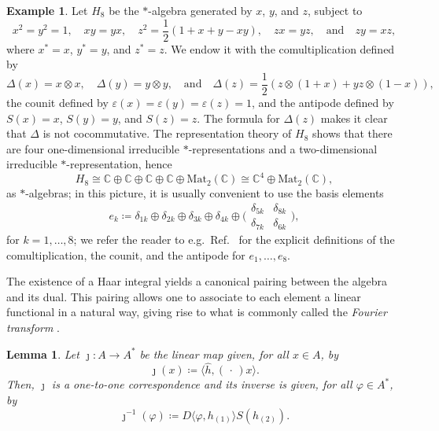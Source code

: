 \documentclass[a4paper,10pt]{amsart}
\newcommand{\eval}[2]{\langle #1 , #2\rangle}
\newcommand{\placeholder}{\,\cdot\,}
\newcommand{\newterm}[1]{\emph{#1}}
\newtheorem{lemma}[theorem]{Lemma}
\theoremstyle{definition}
\newtheorem{example}[theorem]{Example}
\begin{document}
\begin{example}\label{example:H8}
Let $H_8$ be the $*$-algebra generated by $x$, $y$, and $z$, subject to
\begin{equation}
    x^2 = y^2 = 1,
    \quad
    xy = yx,
    \quad
    z^2 = \frac{1}{2}(1 + x + y - xy),
    \quad
    zx = yz,
    \quad\text{and}\quad
    zy = xz,
\end{equation}
where $x^* = x$, $y^* = y$, and $z^*=z$.
We endow it with the comultiplication defined by
\begin{equation}
    \Delta(x) = x \otimes x,
    \quad 
    \Delta(y) = y \otimes y,
    \quad\text{and}\quad
    \Delta(z) = \frac{1}{2} ( z \otimes (1+x) + yz \otimes (1 - x) ),
\end{equation}
the counit defined by $\varepsilon(x) = \varepsilon(y) = \varepsilon(z) = 1$, and the antipode defined by $S(x) = x$, $S(y) = y$, and $S(z) = z$.
The formula for $\Delta(z)$ makes it clear that $\Delta$ is not cocommutative. The representation theory of $H_8$ shows that there are four one-dimensional irreducible $*$-representations and a two-dimensional irreducible $*$-representation, hence
\[
    H_8
    \cong
    \mathbb{C} \oplus \mathbb{C} \oplus \mathbb{C} \oplus \mathbb{C} \oplus \mathrm{Mat}_2(\mathbb{C})
    \cong \mathbb{C}^4 \oplus \mathrm{Mat}_2(\mathbb{C}),
\]
as $*$-algebras; in this picture, it is usually convenient to use the basis elements 
\[
    e_k \coloneqq
    \delta_{1k} \oplus \delta_{2k} \oplus \delta_{3k} \oplus \delta_{4k}
    \oplus
        \big(\begin{smallmatrix}
            \delta_{5k} & \delta_{8k}\\
            \delta_{7k} & \delta_{6k}
        \end{smallmatrix}\big),
\]
for $k=1,\ldots,8$; we refer the reader to e.g.~Ref.~\cite{pal_counterexample_1996} for the explicit definitions of the comultiplication, the counit, and the antipode for $e_1,\ldots,e_8$.
\end{example}

The existence of a Haar integral yields a canonical pairing between the algebra and its dual. This pairing allows one to associate to each element a linear functional in a natural way, giving rise to what is commonly called the \newterm{Fourier transform} \cite{vandaele_fourier_2007}.

\begin{lemma}
\label{lemma:fourier}
    Let $\jmath: A\to A^*$ be the linear map given, for all $x\in A$, by
	\begin{equation}
		\jmath(x)
		 \coloneqq 
		\eval{\hat{h}}{(\placeholder) x}.
	\end{equation}
	Then, $\jmath$ is a one-to-one correspondence and its inverse is given, for all $\varphi\in A^*$, by
	\begin{equation}
		\jmath^{-1}(\varphi)
		  \coloneqq 
		D \eval{\varphi}{h_{(1)}} S(h_{(2)}).
	\end{equation}
\end{lemma}
\end{document}
